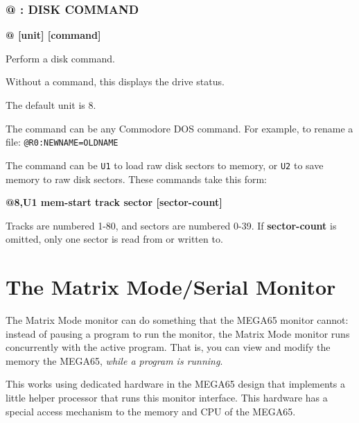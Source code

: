 \subsubsection{@ : DISK COMMAND}
\begin{description}[leftmargin=2cm,style=nextline]
\item [Format:] {\bf @ [unit] [command]}
\item [Usage:] Perform a disk command.

\item [Remarks:] Without a command, this displays the drive status.

    The default unit is 8.

    The command can be any Commodore DOS command. For example, to rename a file: {\tt @R0:NEWNAME=OLDNAME}

    The command can be {\tt U1} to load raw disk sectors to memory, or {\tt U2} to save memory to raw disk sectors. These commands take this form:

    {\bf @8,U1 mem-start track sector [sector-count]}

    Tracks are numbered 1-80, and sectors are numbered 0-39. If {\bf sector-count} is omitted, only one sector is read from or written to.

\end{description}



\section{The Matrix Mode/Serial Monitor}

The Matrix Mode monitor can do something that the MEGA65 monitor cannot: instead of pausing a program to run the monitor, the Matrix Mode monitor runs concurrently with the active program. That is, you can view and modify the memory the MEGA65, {\em while a program is running}.

This works using dedicated hardware in the MEGA65 design that implements a little
helper processor that runs this monitor interface. This hardware has a special access mechanism
to the memory and CPU of the MEGA65.

